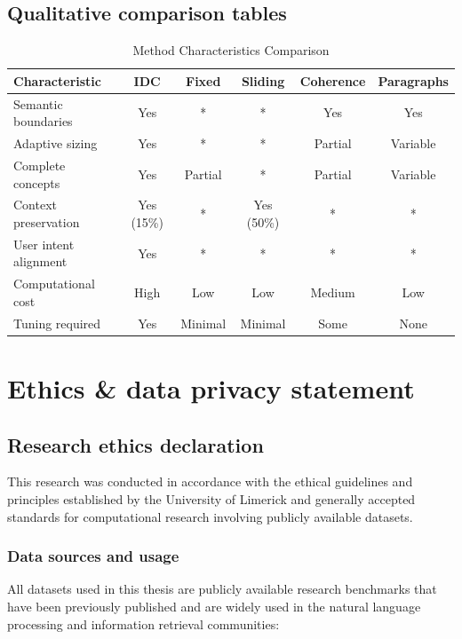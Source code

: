 \documentclass[12pt,a4paper]{report}
\begin{document}
\section{Qualitative comparison tables}

\begin{table}[h!]
\centering
\caption{Method Characteristics Comparison}
\label{tab:method_comparison}
\begin{tabular}{lccccc}
\hline
\textbf{Characteristic} & \textbf{IDC} & \textbf{Fixed} & \textbf{Sliding} & \textbf{Coherence} & \textbf{Paragraphs} \\
\hline
Semantic boundaries & Yes & * & * & Yes & Yes \\
Adaptive sizing & Yes & * & * & Partial & Variable \\
Complete concepts & Yes & Partial & * & Partial & Variable \\
Context preservation & Yes (15\%) & * & Yes (50\%) & * & * \\
User intent alignment & Yes & * & * & * & * \\
Computational cost & High & Low & Low & Medium & Low \\
Tuning required & Yes & Minimal & Minimal & Some & None \\
\hline
\end{tabular}
\end{table}

\chapter{Ethics \& data privacy statement}

\section{Research ethics declaration}

This research was conducted in accordance with the ethical guidelines and principles established by the University of Limerick and generally accepted standards for computational research involving publicly available datasets.

\subsection{Data sources and usage}

All datasets used in this thesis are publicly available research benchmarks that have been previously published and are widely used in the natural language processing and information retrieval communities:
\end{document}
